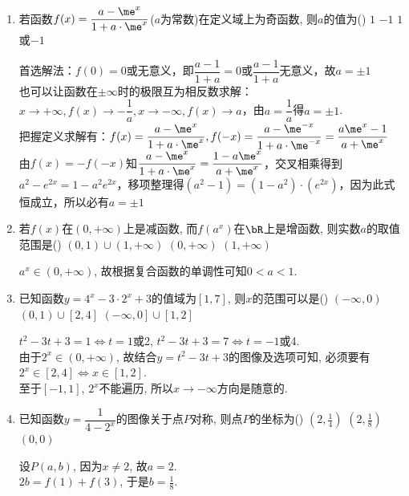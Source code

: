 \begin{enumerate}
\item 若函数$f(x)=\dfrac{a-\me^x}{1+a\cdot\me^x}$($a$为常数)在定义域上为奇函数, 则$a$的值为\dotfill()
{$1$}
{$-1$}
{$1$或$-1$}
\begin{jieda}
首选解法：$f(0)=0$或无意义，即$\dfrac{a-1}{1+a} = 0$或$\dfrac{a-1}{1+a}$无意义，故$a = \pm 1$\\
也可以让函数在$\pm \infty$时的极限互为相反数求解：$x \rightarrow +\infty, f(x) \rightarrow -\dfrac{1}{a}, x \rightarrow -\infty, f(x) \rightarrow a$，由$a = \dfrac{1}{a}$得$a = \pm 1$. \\
把握定义求解有：$f(x) = \dfrac{a-\me^x}{1+a\cdot\me^x}, f(-x) = \dfrac{a-\me^{-x}}{1+a\cdot\me^{-x}} = \dfrac{a\me^{x}-1}{a+\me^{x}}$ \\
由$f(x) = -f(-x)$知$\dfrac{a-\me^x}{1+a\cdot\me^x} = \dfrac{1-a\me^{x}}{a+\me^{x}}$，交叉相乘得到$a^2 - e^{2x} = 1-a^2e^{2x}$，移项整理得$(a^2-1) = (1-a^2)\cdot(e^{2x})$，因为此式恒成立，所以必有$a = \pm 1$
\end{jieda}


\item 若$f(x)$在$(0,+\infty)$上是减函数, 而$f(a^x)$在$\bR$上是增函数, 则实数$a$的取值范围是\dotfill()
{$(0,1)\cup(1,+\infty)$}
{$(0,+\infty)$}
{$(1,+\infty)$}
\begin{jieda}
$a^x\in(0,+\infty)$, 故根据复合函数的单调性可知$0<a<1$. 
\end{jieda}


\item 已知函数$y=4^x-3\cdot2^x+3$的值域为$\left[1,7\right]$, 则$x$的范围可以是\dotfill()
\xx{$\left[2,4\right]$}
{$(-\infty,0)$}
{$(0,1)\cup\left[2,4\right]$}
{$\left(-\infty,0\right]\cup\left[1,2\right]$}
\begin{jieda}
$t^2-3t+3=1\iff t=1$或2, $t^2-3t+3=7\iff t=-1$或4. \\
由于$2^x\in(0,+\infty)$, 故结合$y=t^2-3t+3$的图像及选项可知, 必须要有$2^x\in[2,4]\iff x\in[1,2]$. \\
至于$[-1,1]$, $2^x$不能遍历, 所以$x\to-\infty$方向是随意的. 
\end{jieda}


\item 已知函数$y=\dfrac{1}{4-2^x}$的图像关于点$P$对称, 则点$P$的坐标为\dotfill()
{$(2,\frac{1}{4})$}
{$(2,\frac{1}{8})$}
{$(0,0)$}
\begin{jieda}
设$P(a,b)$, 因为$x\neq 2$, 故$a=2$. \\
$2b=f(1)+f(3)$, 于是$b=\frac{1}{8}$. 
\end{jieda}




\end{enumerate}
